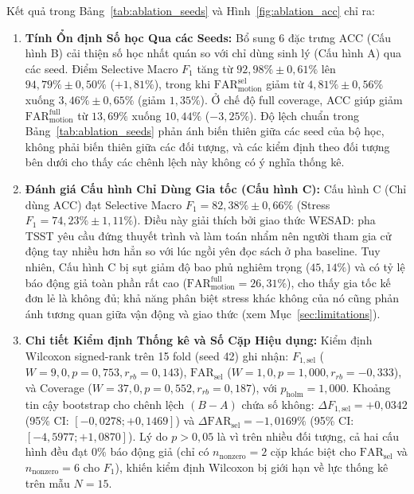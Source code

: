 \documentclass[conference]{IEEEtran}
\begin{document}
Kết quả trong Bảng~\ref{tab:ablation_seeds} và Hình~\ref{fig:ablation_acc} chỉ ra:
\begin{enumerate}
    \item \textbf{Tính Ổn định Số học Qua các Seeds:} Bổ sung 6 đặc trưng ACC (Cấu hình B) cải thiện số học nhất quán so với chỉ dùng sinh lý (Cấu hình A) qua các seed. Điểm Selective Macro $F_1$ tăng từ $92,98\% \pm 0,61\%$ lên $94,79\% \pm 0,50\%$ ($+1,81\%$), trong khi $\text{FAR}_{\text{motion}}^{\text{sel}}$ giảm từ $4,81\% \pm 0,56\%$ xuống $3,46\% \pm 0,65\%$ (giảm $1,35\%$). Ở chế độ full coverage, ACC giúp giảm $\text{FAR}_{\text{motion}}^{\text{full}}$ từ $13,69\%$ xuống $10,44\%$ ($-3,25\%$). Độ lệch chuẩn trong Bảng~\ref{tab:ablation_seeds} phản ánh biến thiên giữa các seed của bộ học, không phải biến thiên giữa các đối tượng, và các kiểm định theo đối tượng bên dưới cho thấy các chênh lệch này không có ý nghĩa thống kê.
    \item \textbf{Đánh giá Cấu hình Chỉ Dùng Gia tốc (Cấu hình C):} Cấu hình C (Chỉ dùng ACC) đạt Selective Macro $F_1 = 82,38\% \pm 0,66\%$ (Stress $F_1 = 74,23\% \pm 1,11\%$). Điều này giải thích bởi giao thức WESAD: pha TSST yêu cầu đứng thuyết trình và làm toán nhẩm nên người tham gia cử động tay nhiều hơn hẳn so với lúc ngồi yên đọc sách ở pha baseline. Tuy nhiên, Cấu hình C bị sụt giảm độ bao phủ nghiêm trọng ($45,14\%$) và có tỷ lệ báo động giả toàn phần rất cao ($\text{FAR}_{\text{motion}}^{\text{full}} = 26,31\%$), cho thấy gia tốc kế đơn lẻ là không đủ; khả năng phân biệt stress khác không của nó cũng phản ánh tương quan giữa vận động và giao thức (xem Mục~\ref{sec:limitations}).
    \item \textbf{Chi tiết Kiểm định Thống kê và Số Cặp Hiệu dụng:} Kiểm định Wilcoxon signed-rank trên 15 fold (seed 42) ghi nhận: $F_{1,\text{sel}}$ ($W = 9,0, p = 0,753, r_{rb} = 0,143$), $\text{FAR}_{\text{sel}}$ ($W = 1,0, p = 1,000, r_{rb} = -0,333$), và Coverage ($W = 37,0, p = 0,552, r_{rb} = 0,187$), với $p_{\text{holm}} = 1,000$. Khoảng tin cậy bootstrap cho chênh lệch $(B - A)$ chứa số không: $\Delta F_{1,\text{sel}} = +0,0342$ (95\% CI: $[-0,0278; +0,1469]$) và $\Delta \text{FAR}_{\text{sel}} = -1,0169\%$ (95\% CI: $[-4,5977; +1,0870]$). Lý do $p > 0,05$ là vì trên nhiều đối tượng, cả hai cấu hình đều đạt $0\%$ báo động giả (chỉ có $n_{\text{nonzero}} = 2$ cặp khác biệt cho $\text{FAR}_{\text{sel}}$ và $n_{\text{nonzero}} = 6$ cho $F_1$), khiến kiểm định Wilcoxon bị giới hạn về lực thống kê trên mẫu $N=15$.
\end{enumerate}
\end{document}
